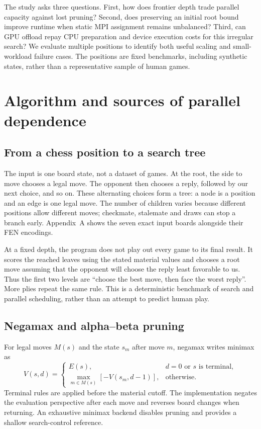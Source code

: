 \documentclass[11pt,a4paper]{article}
\begin{document}
The study asks three questions. First, how does frontier depth trade parallel
capacity against lost pruning? Second, does preserving an initial root bound
improve runtime when static MPI assignment remains unbalanced? Third, can GPU
offload repay CPU preparation and device execution costs for this irregular
search? We evaluate multiple positions to identify both useful scaling and
small-workload failure cases. The positions are fixed benchmarks, including
synthetic states, rather than a representative sample of human games.

\section{Algorithm and sources of parallel dependence}
\subsection{From a chess position to a search tree}
The input is one board state, not a dataset of games. At the root, the side to
move chooses a legal move. The opponent then chooses a reply, followed by our
next choice, and so on. These alternating choices form a tree: a node is a
position and an edge is one legal move. The number of children varies because
different positions allow different moves; checkmate, stalemate and draws can
stop a branch early. Appendix~A shows the seven exact input boards alongside
their FEN encodings.

At a fixed depth, the program does not play out every game to its final result.
It scores the reached leaves using the stated material values and chooses a
root move assuming that the opponent will choose the reply least favorable to
us. Thus the first two levels are ``choose the best move, then face the worst
reply''. More plies repeat the same rule. This is a deterministic benchmark of
search and parallel scheduling, rather than an attempt to predict human play.

\subsection{Negamax and alpha--beta pruning}
For legal moves $M(s)$ and the state $s_m$ after move $m$, negamax writes minimax as
\begin{equation}
 V(s,d)=\begin{cases}
 E(s),&d=0\text{ or }s\text{ is terminal},\\
 \max_{m\in M(s)}[-V(s_m,d-1)],&\text{otherwise}.
 \end{cases}
\end{equation}
Terminal rules are applied before the material cutoff. The implementation
negates the evaluation perspective after each move and reverses board changes
when returning. An exhaustive minimax backend disables pruning and provides a
shallow search-control reference.
\end{document}
